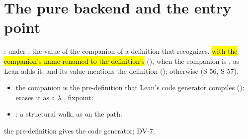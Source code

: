 
\section{The pure backend and the entry point}\label{sec:pure-backend}

\begin{definition}
  \label{def:Erasure-preDef}
  \leanok
   : under , the value of
  the  companion of a definition that 
  recognizes, \hl{with the companion's name renamed to the definition's}
  (), when the companion is , as Lean adds it, and its value
  mentions the definition ();  otherwise (S-56, S-57).
  \begin{itemize}
  \item the companion is the pre-definition that Lean's code generator compiles
        ();  erases it as a $\lambda_\Box$
        fixpoint;
  \item {}: a structural walk, as  on the
         path.
  \end{itemize}
   the pre-definition  gives the code generator;
  DV-7.
\end{definition}


